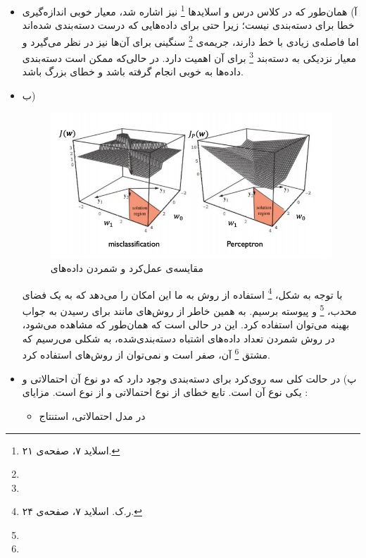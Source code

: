 
\begin{itemize}
	\item آ)
	همان‌طور که در کلاس درس و اسلایدها
	\footnote{اسلاید ۷، صفحه‌ی ۲۱.}
	 نیز اشاره شد، 
	معیار خوبی اندازه‌گیری خطا برای دسته‌بندی نیست؛ زیرا حتی برای داده‌هایی که درست دسته‌بندی شده‌اند اما فاصله‌ی زیادی با خط دارند، جریمه‌ی
	\footnote{}
	سنگینی برای آن‌ها نیز در نظر می‌گیرد و معیار نزدیکی به دسته‌بند 
	\footnote{}
	برای آن اهمیت دارد. در حالی‌که ممکن است دسته‌بندی داده‌ها به خوبی انجام گرفته باشد و خطای
	بزرگ باشد.
	
	\item ب)
	
	\begin{figure}[!hbpt]
		\centering
		\includegraphics[scale=0.6]{./img/1b.png}
		\caption{مقایسه‌ی عمل‌کرد  و شمردن داده‌های }
	\end{figure}
	با توجه به شکل،
	\footnote{ر.ک. اسلاید ۷، صفحه‌ی ۲۴.}
	 استفاده از روش 
	 به ما این امکان را می‌دهد که به یک فضای محدب،
	 \footnote{}
	 و پیوسته برسیم. به همین خاطر از روش‌های  مانند  برای رسیدن به جواب بهینه می‌توان استفاده کرد. این در حالی است که همان‌طور که مشاهده می‌شود، در روش شمردن تعداد داده‌های اشتباه دسته‌بندی‌شده، به شکلی می‌رسیم که مشتق
	 \footnote{}
	  آن، صفر است و نمی‌توان از روش‌های  استفاده کرد. 
	  \item پ)
	  در حالت کلی سه روی‌کرد برای دسته‌بندی وجود دارد که دو نوع آن احتمالاتی و یکی نوع آن 
	   است.
	  تابع خطای 
	  از نوع احتمالاتی و 
	 از نوع 
	 است.
	  مزایای :
	  \begin{itemize}
	  	\item در مدل احتمالاتی، استنتاج

\end{itemize}
\end{itemize}
